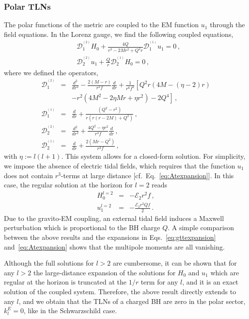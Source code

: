 \documentclass[aps,twocolumn,showpacs,preprintnumbers,nofootinbib,prd,superscriptaddress,groupedaddress,10pt]{revtex4-1}
\def\nn{\nonumber}
\newcommand{\beq}{\begin{eqnarray}}
\newcommand{\eeq}{\end{eqnarray}}
\begin{document}
\subsubsection{Polar TLNs}
The polar functions of the metric are coupled to the EM function $u_1$ through the field equations.
In the Lorenz gauge, we find the following coupled equations,
%
\begin{align}
\label{rn:difeq1}
&\mathcal{D}^{^{(2)}}_1 H_0 + \frac{4 Q}{r^3-2 M r^2+Q^2 r}\mathcal{D}^{^{(1)}}_1 u_1=0\,,\\
\label{rn:difeq2}
&\mathcal{D}^{^{(2)}}_2 u_1 + \frac{Q}{r}\mathcal{D}^{^{(1)}}_2 H_0=0\,,
\end{align}
%
where we defined the operators,
%
\beq
\mathcal{D}^{^{(2)}}_1&=&\frac{d^2}{dr^2} -\frac{2 (M-r)}{r^2 f} \frac{d}{dr}+\frac{1}{r^6 f^2}\left[Q^2 r (4 M-({\eta} -2) r)\right.\nn\\
&&\left.-r^2 \left(4 M^2-2 {\eta}  M r+{\eta}  r^2\right)-2 Q^4 \right]\,,\nonumber\\
%
\mathcal{D}^{^{(1)}}_1&=&\frac{d}{dr} + \frac{\left(Q^2-r^2\right)}{r \left(r (r-2 M)+Q^2\right)}\,,\nonumber\\
%
\mathcal{D}^{^{(2)}}_2&=&\frac{d^2}{dr^2} + \frac{4 Q^2-{\eta} r^2}{r^4 f}\frac{d}{dr} \,,\nonumber\\
%
\mathcal{D}^{^{(1)}}_2&=&\frac{d}{dr}+\frac{2 \left(M  r-Q^2\right)}{r^3f} \,,\nonumber
\eeq
%
with ${\eta}:=l(l+1)$. This system allows for a closed-form solution. For simplicity, we impose the absence of electric tidal fields, which requires that the function $u_1$ does not contain $r^3$-terms at large distance [cf.\ Eq.~\eqref{eq:Atexpansion}]. In this case, the regular solution at the horizon for $l=2$ reads
%
\beq%
H_0^{l=2}&=&-\mathcal{E}_2 r^2f\,,\\
%
u_1^{l=2}&=&-\frac{\mathcal{E}_2 r^2Qf}{2}\,.
\eeq
% 
Due to the gravito-EM coupling, an external tidal field induces a Maxwell perturbation which is proportional to the BH charge $Q$. A simple comparison between the above results and the expansions in Eqs.~\eqref{eq:gttexpansion} and~\eqref{eq:Atexpansion} shows that the multipole moments are all vanishing. 

Although the full solutions for $l>2$ are cumbersome, it can be shown that for any $l>2$ the large-distance expansion of the solutions for $H_0$ and $u_1$ which are regular at the horizon is truncated at the $1/r$ term for any $l$, and it is an exact solution of the coupled system. Therefore, the above result directly extends to any $l$, and we obtain that the TLNs of a charged BH are zero in the polar sector, $k^E_l=0$, like in the Schwarzschild case.
\end{document}
